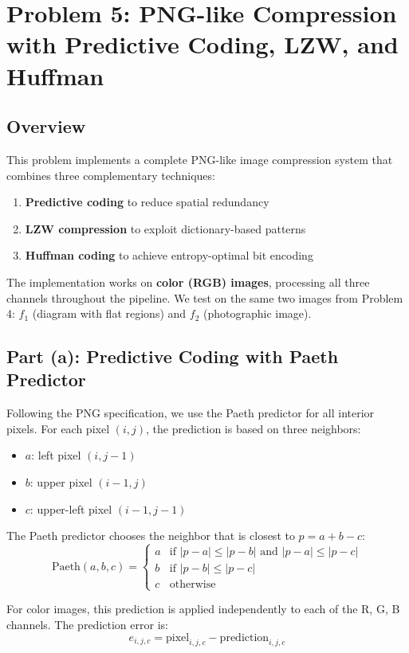 \documentclass[11pt,a4paper]{article}
\begin{document}
\newpage
\section{Problem 5: PNG-like Compression with Predictive Coding, LZW, and Huffman}

\subsection*{Overview}
This problem implements a complete PNG-like image compression system that combines three complementary techniques:
\begin{enumerate}
    \item \textbf{Predictive coding} to reduce spatial redundancy
    \item \textbf{LZW compression} to exploit dictionary-based patterns
    \item \textbf{Huffman coding} to achieve entropy-optimal bit encoding
\end{enumerate}

The implementation works on \textbf{color (RGB) images}, processing all three channels throughout the pipeline. We test on the same two images from Problem 4: $f_1$ (diagram with flat regions) and $f_2$ (photographic image).

\subsection{Part (a): Predictive Coding with Paeth Predictor}
Following the PNG specification, we use the Paeth predictor for all interior pixels. For each pixel $(i,j)$, the prediction is based on three neighbors:
\begin{itemize}
    \item $a$: left pixel $(i, j-1)$
    \item $b$: upper pixel $(i-1, j)$
    \item $c$: upper-left pixel $(i-1, j-1)$
\end{itemize}

The Paeth predictor chooses the neighbor that is closest to $p = a + b - c$:
$$\text{Paeth}(a,b,c) = \begin{cases}
a & \text{if } |p-a| \leq |p-b| \text{ and } |p-a| \leq |p-c| \\
b & \text{if } |p-b| \leq |p-c| \\
c & \text{otherwise}
\end{cases}$$

For color images, this prediction is applied independently to each of the R, G, B channels. The prediction error is:
$$e_{i,j,c} = \text{pixel}_{i,j,c} - \text{prediction}_{i,j,c}$$
\end{document}
